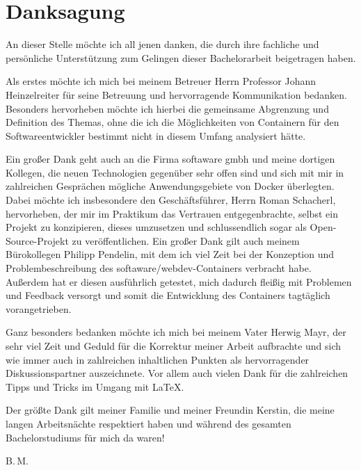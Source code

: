 \chapter*{Danksagung}
An dieser Stelle möchte ich all jenen danken, die durch ihre fachliche und persönliche Unterstützung zum Gelingen dieser Bachelorarbeit beigetragen haben.

Als erstes möchte ich mich bei meinem Betreuer Herrn Professor Johann Heinzelreiter für seine Betreuung und hervorragende Kommunikation bedanken.
Besonders hervorheben möchte ich hierbei die gemeinsame Abgrenzung und Definition des Themas, ohne die ich die Möglichkeiten von Containern für den Softwareentwickler bestimmt nicht in diesem Umfang analysiert hätte.

Ein großer Dank geht auch an die Firma softaware gmbh und meine dortigen Kollegen, die neuen Technologien gegenüber sehr offen sind und sich mit mir in zahlreichen Gesprächen mögliche Anwendungsgebiete von Docker überlegten.
Dabei möchte ich insbesondere den Geschäftsführer, Herrn Roman Schacherl, hervorheben, der mir im Praktikum das Vertrauen entgegenbrachte, selbst ein Projekt zu konzipieren, dieses umzusetzen und schlussendlich sogar als Open-Source-Projekt zu veröffentlichen.
Ein großer Dank gilt auch meinem Bürokollegen Philipp Pendelin, mit dem ich viel Zeit bei der Konzeption und Problembeschreibung des softaware/webdev-Containers verbracht habe.
Außerdem hat er diesen ausführlich getestet, mich dadurch fleißig mit Problemen und Feedback versorgt und somit die Entwicklung des Containers tagtäglich vorangetrieben.

Ganz besonders bedanken möchte ich mich bei meinem Vater Herwig Mayr, der sehr viel Zeit und Geduld für die Korrektur meiner Arbeit aufbrachte und sich wie immer auch in zahlreichen inhaltlichen Punkten als hervorragender Diskussionspartner auszeichnete.
Vor allem auch vielen Dank für die zahlreichen Tipps und Tricks im Umgang mit \LaTeX.

Der größte Dank gilt meiner Familie und meiner Freundin Kerstin, die meine langen Arbeitsnächte respektiert haben und während des gesamten Bachelorstudiums für mich da waren!

\hfill \break
B.\,M.

